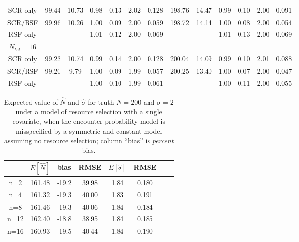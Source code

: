 \documentclass[12pt]{article}
\begin{document}
\begin{table}
\begin{tabular}{ccccccccccccc}
SCR only  &  99.44 &10.73 & 0.98 & 0.13 & 2.02&  0.128& 198.76& 14.47& 0.99&   0.10& 2.00&   0.091\\
SCR/RSF   &  99.96 &10.26 & 1.00 & 0.09 & 2.00&  0.059& 198.72& 14.14& 1.00&   0.08& 2.00&   0.054\\
RSF only  &   --   & --   & 1.01 & 0.12 & 2.00&  0.069&   --  &  --  & 1.01&   0.13& 2.00&   0.069\\
$N_{tel}=16$&        &      &      &     &     &       &       &      &     &       &       &      \\
SCR only  &  99.23 &10.74 & 0.99 & 0.14 & 2.00&  0.128& 200.04& 14.09&0.99&   0.10& 2.01&   0.088  \\
SCR/RSF   &  99.20 & 9.79 & 1.00 & 0.09 & 1.99&  0.057& 200.25& 13.40&1.00&   0.07& 2.00&   0.047 \\
RSF only  &   --   & --   & 1.00 & 0.10 & 1.99&  0.061&   --  &  --  &1.00&   0.11& 2.00&   0.055 \\
\end{tabular}
\label{tab.results1}
\end{table}



\begin{table}
\centering
\caption{Expected value of $\hat{N}$ and $\hat{\sigma}$
 for truth
  $N=200$ and $\sigma=2$ under a model of resource selection with a
  single covariate, when the
encounter probability model is misspecified by a symmetric and
constant model assuming no resource selection; column ``bias'' is {\it
  percent} bias.
}
\begin{tabular}{cccccccc}
\hline \hline
    &   $E[\hat{N}]$ & bias & RMSE & $E[\hat{\sigma}]$ & RMSE \\  \hline
n=2 &     161.48 &-19.2 & 39.98  & 1.84 &  0.180  \\
n=4 &     161.32 &-19.3 &40.00  & 1.83 &  0.191 \\
n=8 &     161.46 &-19.3 &40.06  & 1.84 &  0.184 \\
n=12 &    162.40 &-18.8  &38.95  & 1.84 &  0.185\\
n=16 &    160.93 &-19.5 &40.44  & 1.84 &  0.190 \\
\end{tabular}
\label{tab.bias}
\end{table}
\end{document}
